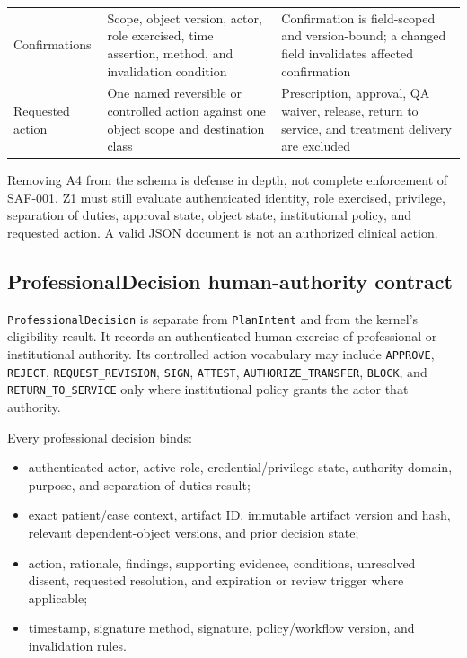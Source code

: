\documentclass[11pt,letterpaper]{article}
\begin{document}
\begin{small}
\begin{longtable}{@{}L{0.19\textwidth}L{0.27\textwidth}L{0.44\textwidth}@{}}
\addlinespace[2pt]
Confirmations & Scope, object version, actor, role exercised, time assertion, method, and invalidation condition & Confirmation is field-scoped and version-bound; a changed field invalidates affected confirmation \\
\addlinespace[2pt]
Requested action & One named reversible or controlled action against one object scope and destination class & Prescription, approval, QA waiver, release, return to service, and treatment delivery are excluded \\
\end{longtable}
\end{small}

Removing A4 from the schema is defense in depth, not complete enforcement of SAF-001. Z1 must still evaluate authenticated identity, role exercised, privilege, separation of duties, approval state, object state, institutional policy, and requested action. A valid JSON document is not an authorized clinical action.

\subsection{ProfessionalDecision human-authority contract}

\texttt{ProfessionalDecision} is separate from \texttt{PlanIntent} and from the kernel's eligibility result. It records an authenticated human exercise of professional or institutional authority. Its controlled action vocabulary may include \texttt{APPROVE}, \texttt{REJECT}, \texttt{REQUEST\_REVISION}, \texttt{SIGN}, \texttt{ATTEST}, \texttt{AUTHORIZE\_TRANSFER}, \texttt{BLOCK}, and \texttt{RETURN\_TO\_SERVICE} only where institutional policy grants the actor that authority.

Every professional decision binds:

\begin{itemize}
\item authenticated actor, active role, credential/privilege state, authority domain, purpose, and separation-of-duties result;
\item exact patient/case context, artifact ID, immutable artifact version and hash, relevant dependent-object versions, and prior decision state;
\item action, rationale, findings, supporting evidence, conditions, unresolved dissent, requested resolution, and expiration or review trigger where applicable;
\item timestamp, signature method, signature, policy/workflow version, and invalidation rules.
\end{itemize}
\end{document}
